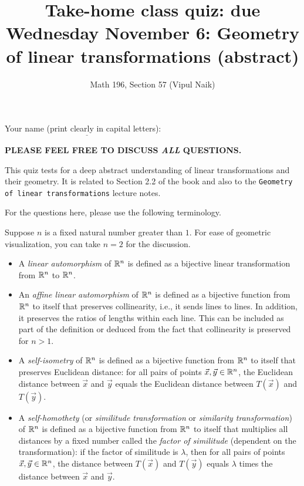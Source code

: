 \documentclass[10pt]{amsart}
\title{Take-home class quiz: due Wednesday November 6: Geometry of linear transformations (abstract)}
\author{Math 196, Section 57 (Vipul Naik)}
\begin{document}
\maketitle

Your name (print clearly in capital letters): $\underline{\qquad\qquad\qquad\qquad\qquad\qquad\qquad\qquad\qquad\qquad}$

{\bf PLEASE FEEL FREE TO DISCUSS {\em ALL} QUESTIONS.}

This quiz tests for a deep abstract understanding of linear
transformations and their geometry. It is related to Section 2.2 of
the book and also to the {\tt Geometry of linear transformations}
lecture notes.

For the questions here, please use the following terminology.

Suppose $n$ is a fixed natural number greater than $1$. For ease of
geometric visualization, you can take $n = 2$ for the discussion.

\begin{itemize}
\item A {\em linear automorphism} of $\mathbb{R}^n$ is defined as
  a bijective linear transformation from $\mathbb{R}^n$ to $\mathbb{R}^n$.
\item An {\em affine linear automorphism} of $\mathbb{R}^n$ is defined as a
  bijective function from $\mathbb{R}^n$ to itself that preserves
  collinearity, i.e., it sends lines to lines. In addition, it
  preserves the ratios of lengths within each line. This can be
  included as part of the definition or deduced from the fact that
  collinearity is preserved for $n > 1$.
\item A {\em self-isometry} of $\mathbb{R}^n$ is defined as a bijective
  function from $\mathbb{R}^n$ to itself that preserves Euclidean distance:
  for all pairs of points $\vec{x},\vec{y} \in \mathbb{R}^n$, the Euclidean
  distance between $\vec{x}$ and $\vec{y}$ equals the Euclidean
  distance between $T(\vec{x})$ and $T(\vec{y})$.
\item A {\em self-homothety} (or {\em similitude transformation} or
  {\em similarity transformation}) of $\mathbb{R}^n$ is defined as a bijective
  function from $\mathbb{R}^n$ to itself that multiplies all distances by a
  fixed number called the {\em factor of similitude} (dependent on the
  transformation): if the factor of similitude is $\lambda$, then for
  all pairs of points $\vec{x},\vec{y} \in \mathbb{R}^n$, the distance between
  $T(\vec{x})$ and $T(\vec{y})$ equals $\lambda$ times the distance
  between $\vec{x}$ and $\vec{y}$.
\end{itemize}
\end{document}
